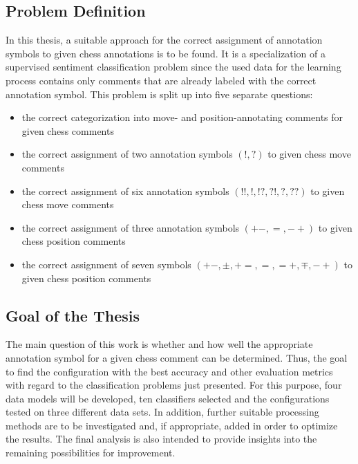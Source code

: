 \documentclass[article,type=msc,colorback,accentcolor=tud7b]{tudthesis}
\begin{document}
  \subsection{Problem Definition}
    In this thesis, a suitable approach for the correct assignment of annotation symbols to given chess annotations is to be found. It is a specialization of a supervised sentiment classification problem since the used data for the learning process contains only comments that are already labeled with the correct annotation symbol. This problem is split up into five separate questions:
    \begin{itemize}
      \item the correct categorization into move- and position-annotating comments for given chess comments
      \item the correct assignment of two annotation symbols $(!, ?)$ to given chess move comments
      \item the correct assignment of six annotation symbols $(!!, !, !?, ?!, ?, ??)$ to given chess move comments
      \item the correct assignment of three annotation symbols $(+-, =, -+)$ to given chess position comments
      \item the correct assignment of seven symbols $(+-, \pm, +=, =, =+, \mp, -+)$ to given chess position comments
    \end{itemize}

  \subsection{Goal of the Thesis}
    The main question of this work is whether and how well the appropriate annotation symbol for a given chess comment can be determined. Thus, the goal to find the configuration with the best accuracy and other evaluation metrics with regard to the classification problems just presented. For this purpose, four data models will be developed, ten classifiers selected and the configurations tested on three different data sets. In addition, further suitable processing methods are to be investigated and, if appropriate, added in order to optimize the results. The final analysis is also intended to provide insights into the remaining possibilities for improvement.
    
\end{document}
